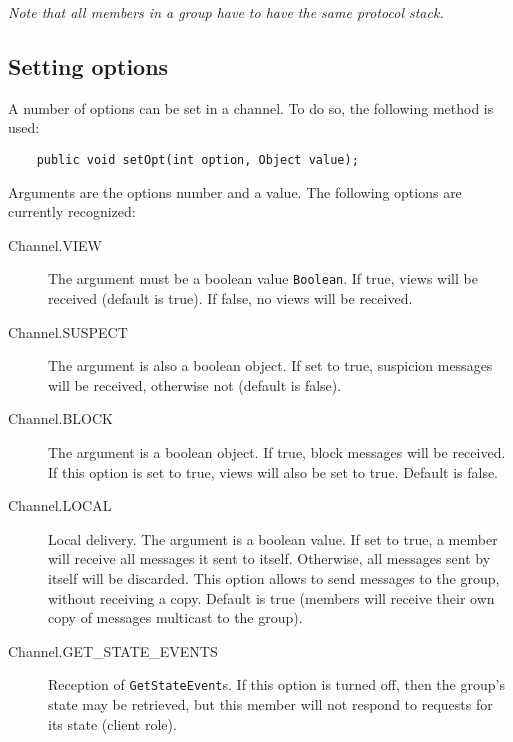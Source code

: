     {\em Note that all members in a group have to have the same protocol stack.}



    \subsection{Setting options} \label{SettingOptions}

    A number of options can be set in a channel. To do so, the following method is
    used:

    \begin{small}
    \begin{verbatim}
    public void setOpt(int option, Object value);
    \end{verbatim}
    \end{small}

    Arguments are the options number and a value. The following options are currently
    recognized:

    \begin{description}

    \item[Channel.VIEW] The argument must be a boolean value {\tt Boolean}. If true,
	                views will be received (default is true). If false, no views
	                will be received.

    \item[Channel.SUSPECT] The argument is also a boolean object. If set to true,
	                   suspicion messages will be received, otherwise not
	                   (default is false).

    \item[Channel.BLOCK] The argument is a boolean object. If true, block messages
	                 will be received. If this option is set to true, views will
	                 also be set to true. Default is false.

    \item[Channel.LOCAL] Local delivery. The argument is a boolean value. If set to
	                 true, a member will receive all messages it sent to
	                 itself. Otherwise, all messages sent by itself will be
	                 discarded. This option allows to send messages to the group,
	                 without receiving a copy. Default is true (members will
	                 receive their own copy of messages multicast to the group).

    \item[Channel.GET\_STATE\_EVENTS] Reception of {\tt GetStateEvent}s. If this option is
	  	              turned off, then the group's state may be retrieved,
	  	              but this member will not respond to requests for its
	  	              state (client role).

    \end{description}

